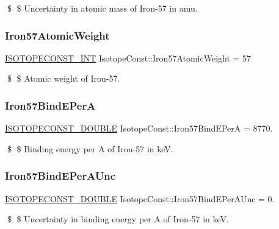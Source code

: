 \$ \$ Uncertainty in atomic mass of Iron-\/57 in amu. \mbox{\label{group___isotope_const-_iron-_fe57_gafea3a7ba389364244c7b4ad5d872b969}} 
\subsubsection{\texorpdfstring{Iron57\+Atomic\+Weight}{Iron57AtomicWeight}}
{\footnotesize\ttfamily \mbox{\hyperlink{group___isotope_const-_macros_ga5f18360b3e99483a35c32d789e62621c}{I\+S\+O\+T\+O\+P\+E\+C\+O\+N\+S\+T\+\_\+\+I\+NT}} Isotope\+Const\+::\+Iron57\+Atomic\+Weight = 57}

\$ \$ Atomic weight of Iron-\/57. \mbox{\label{group___isotope_const-_iron-_fe57_gadd8ac2eca4d1ff480ebd5b93d337ccdf}} 
\subsubsection{\texorpdfstring{Iron57\+Bind\+E\+PerA}{Iron57BindEPerA}}
{\footnotesize\ttfamily \mbox{\hyperlink{group___isotope_const-_macros_ga8f45a7272ce02c0b4c65c44636ed719a}{I\+S\+O\+T\+O\+P\+E\+C\+O\+N\+S\+T\+\_\+\+D\+O\+U\+B\+LE}} Isotope\+Const\+::\+Iron57\+Bind\+E\+PerA = 8770.}

\$ \$ Binding energy per A of Iron-\/57 in keV. \mbox{\label{group___isotope_const-_iron-_fe57_gae9874c2dd75c460c17ca5fa7ee189177}} 
\subsubsection{\texorpdfstring{Iron57\+Bind\+E\+Per\+A\+Unc}{Iron57BindEPerAUnc}}
{\footnotesize\ttfamily \mbox{\hyperlink{group___isotope_const-_macros_ga8f45a7272ce02c0b4c65c44636ed719a}{I\+S\+O\+T\+O\+P\+E\+C\+O\+N\+S\+T\+\_\+\+D\+O\+U\+B\+LE}} Isotope\+Const\+::\+Iron57\+Bind\+E\+Per\+A\+Unc = 0.}

\$ \$ Uncertainty in binding energy per A of Iron-\/57 in keV. \mbox{\label{group___isotope_const-_iron-_fe57_ga6215ea4a3694cf17075cf35871f793d5}} 
